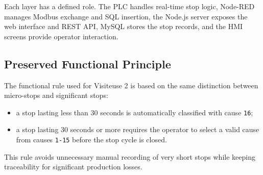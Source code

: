 Each layer has a defined role. The PLC handles real-time stop logic, Node-RED manages Modbus exchange and SQL insertion, the Node.js server exposes the web interface and REST API, MySQL stores the stop records, and the HMI screens provide operator interaction.

\begin{table}[H]
\centering
\caption{Responsibilities of the main components used for Visiteuse 2}
\end{table}

\subsection{Preserved Functional Principle}
The functional rule used for Visiteuse 2 is based on the same distinction between micro-stops and significant stops:

\begin{itemize}[leftmargin=1.1cm]
  \item a stop lasting less than 30 seconds is automatically classified with cause \texttt{16};
  \item a stop lasting 30 seconds or more requires the operator to select a valid cause from causes \texttt{1-15} before the stop cycle is closed.
\end{itemize}

This rule avoids unnecessary manual recording of very short stops while keeping traceability for significant production losses.

